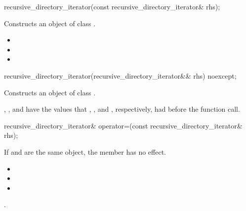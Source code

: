%
\begin{itemdecl}
recursive_directory_iterator(const recursive_directory_iterator& rhs);
\end{itemdecl}

\begin{itemdescr}
\pnum
\effects Constructs an object of class .

\pnum
\ensures
\begin{itemize}
\item {}
\item {}
\item {}
\end{itemize}
\end{itemdescr}

%
\begin{itemdecl}
recursive_directory_iterator(recursive_directory_iterator&& rhs) noexcept;
\end{itemdecl}

\begin{itemdescr}
\pnum
\effects Constructs an object of class .

\pnum
\ensures {}, ,
  and  have the values that
  , , and
  , respectively, had before the function call.
\end{itemdescr}

%
\begin{itemdecl}
recursive_directory_iterator& operator=(const recursive_directory_iterator& rhs);
\end{itemdecl}

\begin{itemdescr}
\pnum
\effects If  and  are the same
  object, the member has no effect.

\pnum
\ensures
\begin{itemize}
\item {}
\item {}
\item {}
\end{itemize}

\pnum
\returns {}.
\end{itemdescr}

